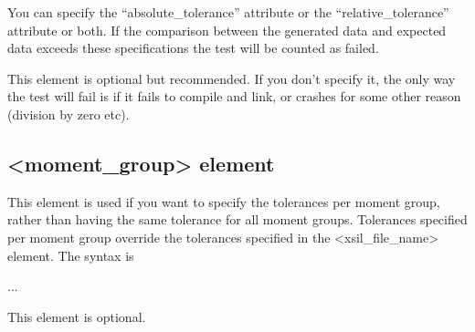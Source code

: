 \documentclass[letterpaper,10pt,english]{sphinxmanual}
\begin{document}
\sphinxAtStartPar
You can specify the “absolute\_tolerance” attribute or the “relative\_tolerance” attribute or both. If the comparison between the generated data and expected data exceeds these specifications the test will be counted as failed.

\sphinxAtStartPar
This element is optional but recommended. If you don’t specify it, the only way the test will fail is if it fails to compile and link, or crashes for some other reason (division by zero etc).


\subsection{\textless{}moment\_group\textgreater{} element}
\label{\detokenize{developer:moment-group-element}}\label{\detokenize{developer:momentgroupelement}}
\sphinxAtStartPar
This element is used if you want to specify the tolerances per moment group, rather than having the same tolerance for all moment groups. Tolerances specified per moment group override the tolerances specified in the \textless{}xsil\_file\_name\textgreater{} element. The syntax is

\begin{sphinxVerbatim}[commandchars=\\\{\}]
         
        
        
    ...
\end{sphinxVerbatim}

\sphinxAtStartPar
This element is optional.

\ignorespaces 
\end{document}
